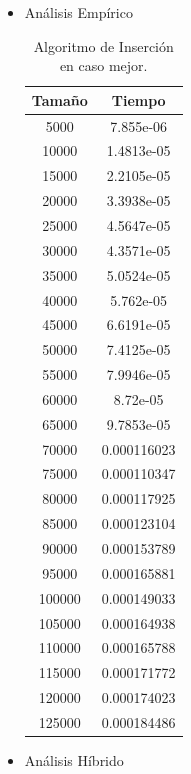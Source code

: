 \documentclass[a4paper,12pt,twoside]{article} %
\begin{document}
	\begin{itemize}
	\item Análisis Empírico
	
	\begin{table}[h]
	\begin{center}
		\begin{tabular}{|c|c|}
		\hline
		Tamaño & Tiempo \\
		\hline
		5000 & 7.855e-06 \\ 
		10000 & 1.4813e-05 \\ 
		15000 & 2.2105e-05 \\ 
		20000 & 3.3938e-05 \\ 
		25000 & 4.5647e-05 \\ 
		30000 & 4.3571e-05 \\ 
		35000 & 5.0524e-05 \\ 
		40000 & 5.762e-05 \\ 
		45000 & 6.6191e-05 \\ 
		50000 & 7.4125e-05 \\ 
		55000 & 7.9946e-05 \\ 
		60000 & 8.72e-05 \\ 
		65000 & 9.7853e-05 \\ 
		70000 & 0.000116023 \\ 
		75000 & 0.000110347 \\ 
		80000 & 0.000117925 \\ 
		85000 & 0.000123104 \\ 
		90000 & 0.000153789 \\ 
		95000 & 0.000165881 \\ 
		100000 & 0.000149033 \\ 
		105000 & 0.000164938 \\ 
		110000 & 0.000165788 \\ 
		115000 & 0.000171772 \\ 
		120000 & 0.000174023 \\ 
		125000 & 0.000184486 \\
		\hline
		\end{tabular}
	\end{center}
	\caption{Algoritmo de Inserción en caso mejor.}
\end{table}
\newpage
	
	\item Análisis Híbrido
\begin{figure}[h]
  \begin{center}
  

\end{center}
\end{figure}
\end{itemize}
\end{document}
